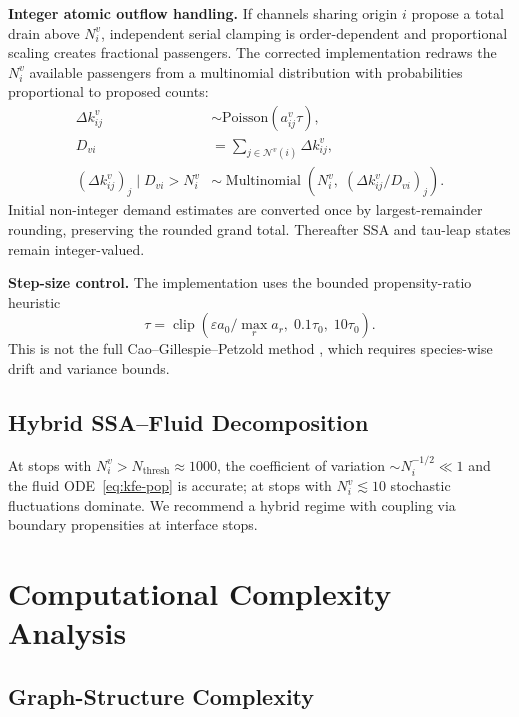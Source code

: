 \documentclass[11pt,a4paper]{article}
\theoremstyle{plain}
\theoremstyle{definition}
\theoremstyle{remark}
\begin{document}
\textbf{Integer atomic outflow handling.} If channels sharing origin $i$
propose a total drain above $N_i^v$, independent serial clamping is
order-dependent and proportional scaling creates fractional passengers.  The
corrected implementation redraws the $N_i^v$ available passengers from a
multinomial distribution with probabilities proportional to proposed counts:
\begin{align}
  \Delta k^v_{ij} &\sim \mathrm{Poisson}(a^v_{ij}\tau), \label{eq:draw}\\
  D_{vi} &= \textstyle\sum_{j\in\mathcal{N}^v(i)}\Delta k^v_{ij},
    \label{eq:total-out}\\
  (\Delta k^v_{ij})_j \mid D_{vi}>N_i^v
  &\sim \operatorname{Multinomial}\!\left(
  N_i^v,\;(\Delta k^v_{ij}/D_{vi})_j\right).
\end{align}
Initial non-integer demand estimates are converted once by largest-remainder
rounding, preserving the rounded grand total.  Thereafter SSA and tau-leap
states remain integer-valued.

\textbf{Step-size control.}
The implementation uses the bounded propensity-ratio heuristic
\begin{equation}
  \tau = \operatorname{clip}\!\left(
    \varepsilon a_0/\max_r a_r,\;0.1\tau_0,\;10\tau_0\right).
\end{equation}
This is not the full Cao--Gillespie--Petzold method \cite{cao2006}, which
requires species-wise drift and variance bounds.

\subsection{Hybrid SSA--Fluid Decomposition}

At stops with $N^v_i>N_{\mathrm{thresh}}\approx1000$, the coefficient of
variation $\sim N_i^{-1/2}\ll1$ and the fluid ODE~\eqref{eq:kfe-pop} is
accurate; at stops with $N^v_i\lesssim10$ stochastic fluctuations dominate.
We recommend a hybrid regime with coupling via boundary propensities at
interface stops.

\section{Computational Complexity Analysis}
\label{sec:complexity}

\subsection{Graph-Structure Complexity}
\end{document}
